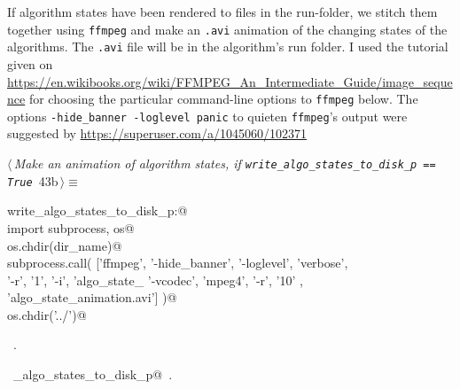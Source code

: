 \documentclass[11.5pt]{report}
\begin{document}
\vspace{-0.8cm}\newchunk If algorithm states have been rendered to files in the run-folder, we stitch them together using \verb|ffmpeg|
and make an \verb|.avi| animation of the changing states of the algorithms. The \verb|.avi| file will be in the algorithm's
run folder. I used the  tutorial given on \url{https://en.wikibooks.org/wiki/FFMPEG_An_Intermediate_Guide/image_sequence}
for choosing the particular command-line options to \verb|ffmpeg| below. The options \texttt{-hide\_banner -loglevel panic} 
to quieten \verb|ffmpeg|'s output were suggested by  \url{https://superuser.com/a/1045060/102371} 


\begin{flushleft} \small\label{scrap62}\raggedright\small
{} $\langle\,${\itshape Make an animation of algorithm states, if \verb|write_algo_states_to_disk_p == True|}\nobreak\ {\footnotesize {43b}}$\,\rangle\equiv$
\vspace{-1ex}
\begin{list}{}{} \item
\mbox{}\verb@if write_algo_states_to_disk_p:@\\
\mbox{}\verb@     import subprocess, os@\\
\mbox{}\verb@     os.chdir(dir_name)@\\
\mbox{}\verb@     subprocess.call( ['ffmpeg',  '-hide_banner', '-loglevel', 'verbose', \@\\
\mbox{}\verb@                       '-r', '1',  '-i', 'algo_state_%05d.png', \@\\
\mbox{}\verb@                       '-vcodec', 'mpeg4', '-r', '10' , \@\\
\mbox{}\verb@                       'algo_state_animation.avi']  )@\\
\mbox{}\verb@     os.chdir('../')@\\
\mbox{}\verb@@{\NWsep}
\end{list}
\vspace{-1.5ex}
\footnotesize
\begin{list}{}{\setlength{\itemsep}{-\parsep}\setlength{\itemindent}{-\leftmargin}}
\item \NWtxtMacroRefIn\ .
\item \NWtxtIdentsUsed\nobreak\  \verb@write_algo_states_to_disk_p@\nobreak\ .
\item{}
\end{list}
\vspace{4ex}
\end{flushleft}
\end{document}
